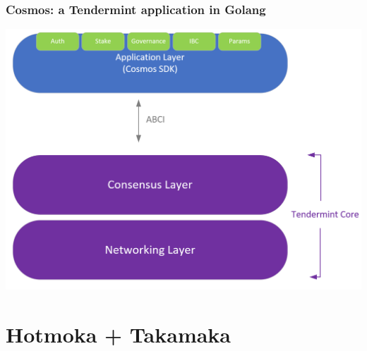 \documentclass[11pt]{beamer}  %
\begin{document}
\begin{frame}\frametitle{Cosmos: a Tendermint application in Golang}

  \begin{center}
    \includegraphics[scale=0.2,clip=false]{pictures/cosmos.png}
  \end{center}

\end{frame}

\section{Hotmoka + Takamaka}
\end{document}
